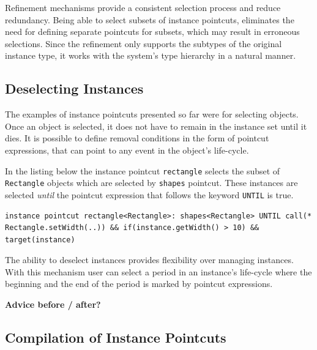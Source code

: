 \documentclass{llncs}
\begin{document}
Refinement mechanisms provide a consistent selection process and reduce redundancy. Being able to select subsets of instance pointcuts, eliminates the need for defining separate pointcuts for subsets, which may result in erroneous selections. Since the refinement only supports the subtypes of the original instance type, it works with the system's type hierarchy in a natural manner. 

\subsection{Deselecting Instances}
\label{sec:deselect}
The examples of instance pointcuts presented so far were for selecting objects. Once an object is selected, it does not have to remain in the instance set until it dies. It is possible to define removal conditions in the form of pointcut expressions, that can point to any event in the object's life-cycle.

In the listing below the instance pointcut \texttt{rectangle} selects the subset of \texttt{Rectangle} objects which are selected by \texttt{shapes} pointcut. These instances are selected \emph{until} the pointcut expression that follows the keyword \texttt{UNTIL} is true.

\begin{lstlisting}[float=h!]
instance pointcut rectangle<Rectangle>: shapes<Rectangle> UNTIL call(* Rectangle.setWidth(..)) && if(instance.getWidth() > 10) && target(instance)
\end{lstlisting}

The ability to deselect instances provides flexibility over managing instances. With this mechanism user can select a period in an instance's life-cycle where the beginning and the end of the period is marked by pointcut expressions.

\textbf{\textcolor[rgb]{1,0.41,0.13}{Advice before / after?}}

\subsection{Compilation of Instance Pointcuts}
\end{document}
